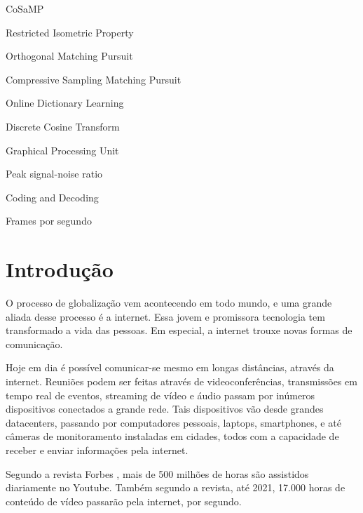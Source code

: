 \documentclass[cic,tc]{iiufrgs}
\begin{document}
\begin{listofabbrv}{CoSaMP}
    \item[RIP] Restricted Isometric Property
    \item[OMP] Orthogonal Matching Pursuit
    \item[CoSaMP] Compressive Sampling Matching Pursuit 
    \item[ODL] Online Dictionary Learning 
    \item[DCT] Discrete Cosine Transform 
    \item[GPU] Graphical Processing Unit
    \item[PSNR] Peak signal-noise ratio 
    \item[CoDec] Coding and Decoding  
    \item[FPS] Frames por segundo
\end{listofabbrv}


\tableofcontents


\chapter{Introdução}
O processo de globalização vem acontecendo em todo mundo, 
e uma grande aliada desse processo é a internet.
Essa jovem e promissora tecnologia tem transformado a vida das pessoas.
Em especial, a internet trouxe novas formas de comunicação.

Hoje em dia é possível comunicar-se mesmo em longas distâncias, 
através da internet.
Reuniões podem ser feitas através de videoconferências, transmissões 
em tempo real de eventos, streaming de vídeo e áudio passam por 
inúmeros dispositivos conectados a grande rede.
Tais dispositivos vão desde grandes datacenters, passando por computadores 
pessoais, laptops, smartphones, e até câmeras de monitoramento instaladas
em cidades, todos com a capacidade de receber e enviar informações 
pela internet.

Segundo a revista Forbes \cite{VideoMarketing}, mais de 500 milhões de horas são assistidos 
diariamente no Youtube. 
Também segundo a revista, até 2021, 17.000 horas de conteúdo de vídeo passarão 
pela internet, por segundo.
\end{document}
